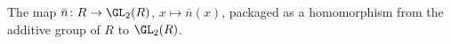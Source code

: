 The map $\bar n\colon R\to\GL_2(R)$, $x\mapsto\bar n(x)$, packaged as a homomorphism from the additive group of $R$ to $\GL_2(R)$.
